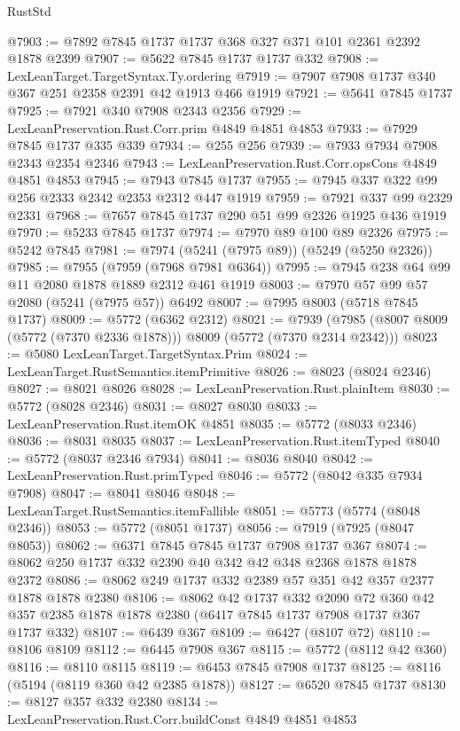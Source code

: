 \begin{lexlean}{RustStd}
\begin{coremodule}
{\begin{coremodule}
{{{{{{{{{{{{{{{{{{{{{{{{{{{{{@7903 := @7892 @7845 @1737 @1737 @368 @327 @371 @101 @2361 @2392 @1878 @2399
@7907 := @5622 @7845 @1737 @1737 @332
@7908 := LexLeanTarget.TargetSyntax.Ty.ordering
@7919 := @7907 @7908 @1737 @340 @367 @251 @2358 @2391 @42 @1913 @466 @1919
@7921 := @5641 @7845 @1737
@7925 := @7921 @340 @7908 @2343 @2356
@7929 := LexLeanPreservation.Rust.Corr.prim @4849 @4851 @4853
@7933 := @7929 @7845 @1737 @335 @339
@7934 := @255 @256
@7939 := @7933 @7934 @7908 @2343 @2354 @2346
@7943 := LexLeanPreservation.Rust.Corr.opsCons @4849 @4851 @4853
@7945 := @7943 @7845 @1737
@7955 := @7945 @337 @322 @99 @256 @2333 @2342 @2353 @2312 @447 @1919
@7959 := @7921 @337 @99 @2329 @2331
@7968 := @7657 @7845 @1737 @290 @51 @99 @2326 @1925 @436 @1919
@7970 := @5233 @7845 @1737
@7974 := @7970 @89 @100 @89 @2326
@7975 := @5242 @7845
@7981 := @7974 (@5241 (@7975 @89)) (@5249 (@5250 @2326))
@7985 := @7955 (@7959 (@7968 @7981 @6364))
@7995 := @7945 @238 @64 @99 @11 @2080 @1878 @1889 @2312 @461 @1919
@8003 := @7970 @57 @99 @57 @2080 (@5241 (@7975 @57)) @6492
@8007 := @7995 @8003 (@5718 @7845 @1737)
@8009 := @5772 (@6362 @2312)
@8021 := @7939 (@7985 (@8007 @8009 (@5772 (@7370 @2336 @1878))) @8009 (@5772 (@7370 @2314 @2342)))
@8023 := @5080 LexLeanTarget.TargetSyntax.Prim
@8024 := LexLeanTarget.RustSemantics.itemPrimitive
@8026 := @8023 (@8024 @2346)
@8027 := @8021 @8026
@8028 := LexLeanPreservation.Rust.plainItem
@8030 := @5772 (@8028 @2346)
@8031 := @8027 @8030
@8033 := LexLeanPreservation.Rust.itemOK @4851
@8035 := @5772 (@8033 @2346)
@8036 := @8031 @8035
@8037 := LexLeanPreservation.Rust.itemTyped
@8040 := @5772 (@8037 @2346 @7934)
@8041 := @8036 @8040
@8042 := LexLeanPreservation.Rust.primTyped
@8046 := @5772 (@8042 @335 @7934 @7908)
@8047 := @8041 @8046
@8048 := LexLeanTarget.RustSemantics.itemFallible
@8051 := @5773 (@5774 (@8048 @2346))
@8053 := @5772 (@8051 @1737)
@8056 := @7919 (@7925 (@8047 @8053))
@8062 := @6371 @7845 @7845 @1737 @7908 @1737 @367
@8074 := @8062 @250 @1737 @332 @2390 @40 @342 @42 @348 @2368 @1878 @1878 @2372
@8086 := @8062 @249 @1737 @332 @2389 @57 @351 @42 @357 @2377 @1878 @1878 @2380
@8106 := @8062
    @42
    @1737
    @332
    @2090
    @72
    @360
    @42
    @357
    @2385
    @1878
    @1878
    @2380
    (@6417 @7845 @1737 @7908 @1737 @367 @1737 @332)
@8107 := @6439 @367
@8109 := @6427 (@8107 @72)
@8110 := @8106 @8109
@8112 := @6445 @7908 @367
@8115 := @5772 (@8112 @42 @360)
@8116 := @8110 @8115
@8119 := @6453 @7845 @7908 @1737
@8125 := @8116 (@5194 (@8119 @360 @42 @2385 @1878))
@8127 := @6520 @7845 @1737
@8130 := @8127 @357 @332 @2380
@8134 := LexLeanPreservation.Rust.Corr.buildConst @4849 @4851 @4853
}}}}}}}}}}}}}}}}}}}}}}}}}}}}}
\end{coremodule}}
\end{coremodule}
\end{lexlean}
